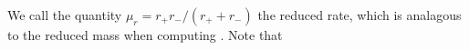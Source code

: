 We call the quantity \(\mu_r = r_+r_-/(r_+ + r_-)\) the reduced rate, which is analagous to the reduced mass when computing .  Note that